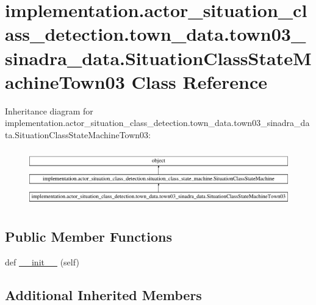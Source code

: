 \hypertarget{classimplementation_1_1actor__situation__class__detection_1_1town__data_1_1town03__sinadra__data51d2866043798c330fb9ba17644a4a6f}{}\section{implementation.\+actor\+\_\+situation\+\_\+class\+\_\+detection.\+town\+\_\+data.\+town03\+\_\+sinadra\+\_\+data.\+Situation\+Class\+State\+Machine\+Town03 Class Reference}
\label{classimplementation_1_1actor__situation__class__detection_1_1town__data_1_1town03__sinadra__data51d2866043798c330fb9ba17644a4a6f}
Inheritance diagram for implementation.\+actor\+\_\+situation\+\_\+class\+\_\+detection.\+town\+\_\+data.\+town03\+\_\+sinadra\+\_\+data.\+Situation\+Class\+State\+Machine\+Town03\+:\begin{figure}[H]
\begin{center}
\leavevmode
\includegraphics[height=2.503726cm]{classimplementation_1_1actor__situation__class__detection_1_1town__data_1_1town03__sinadra__data51d2866043798c330fb9ba17644a4a6f}
\end{center}
\end{figure}
\subsection*{Public Member Functions}
\begin{DoxyCompactItemize}
\item 
def \hyperlink{classimplementation_1_1actor__situation__class__detection_1_1town__data_1_1town03__sinadra__data51d2866043798c330fb9ba17644a4a6f_a247f387d4016f760cb64c3c348db587e}{\+\_\+\+\_\+init\+\_\+\+\_\+} (self)
\end{DoxyCompactItemize}
\subsection*{Additional Inherited Members}



